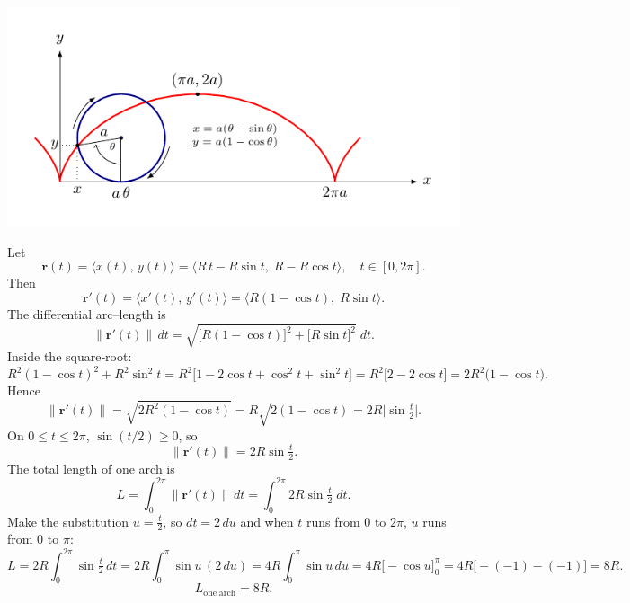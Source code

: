 \documentclass[preview, border=15pt]{standalone}
\begin{document}
\begin{center}
	\endanimateinline
\end{center}

\begin{center}
	\includegraphics[scale=1.25]{../riemann-tikz/cycloid}
\end{center}
Let 
\[
\mathbf r(t)
=\bigl\langle x(t),\,y(t)\bigr\rangle
=\bigl\langle R\,t - R\sin t,\;R - R\cos t\bigr\rangle,
\quad t\in[0,2\pi].
\]
Then
\[
\mathbf r'(t)
=\bigl\langle x'(t),\,y'(t)\bigr\rangle
=\bigl\langle R(1-\cos t),\;R\sin t\bigr\rangle.
\]
The differential arc–length is
\[
\bigl\|\mathbf r'(t)\bigr\|\,dt
=\sqrt{\bigl[R(1-\cos t)\bigr]^2 + \bigl[R\sin t\bigr]^2}\;dt.
\]
Inside the square‐root:
\[
R^2(1-\cos t)^2 + R^2\sin^2t
=R^2\bigl[1 -2\cos t+\cos^2t +\sin^2t\bigr]
=R^2\bigl[2 -2\cos t\bigr]
=2R^2\bigl(1-\cos t\bigr).
\]
Hence
\[
\|\mathbf r'(t)\|
=\sqrt{2R^2(1-\cos t)}
=R\sqrt{2(1-\cos t)}
=2R\bigl|\sin\!\tfrac t2\bigr|.
\]
On \(0\le t\le2\pi\), \(\sin(t/2)\ge0\), so
\[
\|\mathbf r'(t)\|=2R\sin\!\tfrac t2.
\]
The total length of one arch is
\[
L=\int_0^{2\pi}\|\mathbf r'(t)\|\,dt
=\int_0^{2\pi}2R\sin\!\tfrac t2\;dt.
\]
Make the substitution \(u=\tfrac t2\), so \(dt=2\,du\) and when \(t\) runs from \(0\) to \(2\pi\), \(u\) runs from \(0\) to \(\pi\):
\[
L
=2R\int_{0}^{2\pi}\sin\!\tfrac t2\,dt
=2R\int_{0}^{\pi}\sin u\,(2\,du)
=4R\int_{0}^{\pi}\sin u\,du
=4R\bigl[-\cos u\bigr]_0^{\pi}
=4R\bigl[-(-1)-(-1)\bigr]
=8R.
\]
\[
\boxed{L_{\mathrm{one\;arch}}=8R.}
\]
\end{document}
